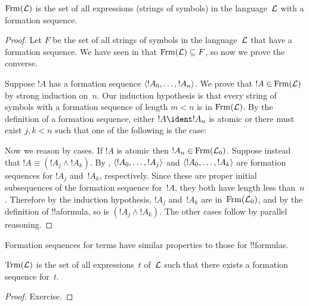 \documentclass[../../../include/open-logic-section]{subfiles}
\begin{document}
\begin{thm}
$\Frm[L]$ is the set of all expressions (strings of symbols)
in the language~$\Lang L$ with a formation sequence.
\end{thm}

\begin{proof}
Let $F$ be the set of all strings of symbols in the language~$\Lang L$
that have a formation sequence. We have seen in
 that $\Frm[L] \subseteq F$, so now
we prove the converse.

Suppose $!A$ has a formation sequence $\langle !A_0,\dotsc,!A_n \rangle$.
We prove that $!A \in \Frm[L]$ by strong induction on~$n$.
Our induction hypothesis is that every string of symbols with a
formation sequence of length $m < n$ is in $\Frm[L]$.
By the definition of a formation sequence, either $!A \ident !A_n$ is
atomic or there must exist $j,k < n$ such that one of the
following is the case:
\begin{enumerate}
\end{enumerate}
Now we reason by cases. If $!A$ is atomic then
$!A_n \in \Frm[L_0]$. Suppose instead that
$!A \equiv (!A_j \land !A_k)$. By 
,
$\langle !A_0,\dotsc,!A_j \rangle$ and $\langle !A_0,\dotsc,!A_k \rangle$ are
formation sequences for $!A_j$ and~$!A_k$, respectively. Since
these are proper initial subsequences of the formation sequence
for~$!A$, they both have length less than~$n$. Therefore by
the induction hypothesis, $!A_j$ and~$!A_k$ are in~$\Frm[L_0]$,
and by the definition of !!a{formula}, so is
$(!A_j \land !A_k)$. The other cases follow by parallel
reasoning.
\end{proof}

Formation sequences for terms have similar properties to those
for !!{formula}s.

\begin{prop}
$\Trm[L]$ is the set of all expressions~$t$ of~$\Lang L$
such that there exists a formation sequence for~$t$.
\end{prop}

\begin{proof}
Exercise.
\end{proof}
\end{document}

